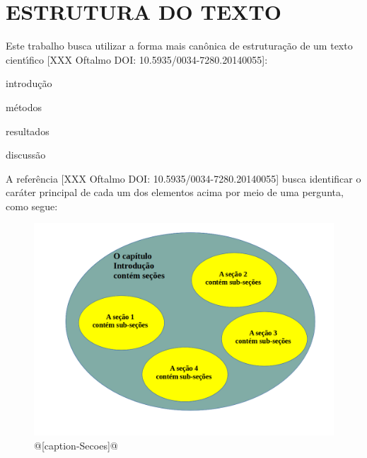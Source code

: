 \documentclass[
12pt,		%
openright,	%
twoside,  %
a4paper,			%
chapter=TITLE,		%
english,			%
french,				%
spanish,			%
brazil				%
]{USPSC-classe/USPSC}
\begin{document}

\tableofcontents*
\cleardoublepage
\textual

\chapter[ESTRUTURA DO TEXTO]{ESTRUTURA DO TEXTO}\label{ESTRUTURA DO TEXTO}
Este trabalho busca utilizar a forma mais can\^onica de estrutura\c{c}\~ao de um texto cient\'{\i}fico [XXX Oftalmo DOI: 10.5935/0034-7280.20140055]:





\begin{alineas}
\item introdu\c{c}\~ao
\item m\'etodos
\item resultados
\item discuss\~ao
\end{alineas}

A refer\^encia [XXX Oftalmo DOI: 10.5935/0034-7280.20140055] busca identificar o car\'ater principal de cada um dos elementos acima por meio de uma pergunta, como segue:






\begin{figure}[htb]

	\begin{center}

		\includegraphics[scale=0.5]{../../imagens/Secoes.png}

	\end{center}

	\caption{\label{Secoes}@[caption-Secoes]@}


\end{figure}
\end{document}
